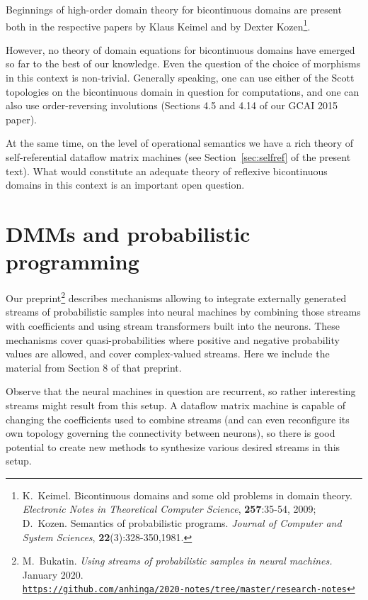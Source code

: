 \documentclass{article}
\begin{document}
Beginnings of high-order domain theory for bicontinuous domains are present both in the respective papers by Klaus Keimel and by Dexter Kozen\footnote{K.~Keimel. Bicontinuous domains and some old problems in domain theory. {\em Electronic Notes in Theoretical Computer Science}, {\bf 257}:35-54, 2009; D.~Kozen. Semantics of probabilistic programs. {\em Journal of Computer and System Sciences}, {\bf 22}(3):328-350,1981.}.

However, no theory of domain equations for bicontinuous domains have emerged so far to the best of our knowledge.
Even the question of the choice of morphisms in this context is non-trivial. Generally speaking, one can use either of the Scott topologies
on the bicontinuous domain in question for computations, and one can also use order-reversing involutions (Sections 4.5 and 4.14 of our GCAI 2015 paper).

At the same time, on the level of operational semantics we have a rich theory of self-referential dataflow
matrix machines (see Section~\ref{sec:selfref} of the present text). What would constitute an adequate theory of reflexive bicontinuous domains in this context is an important open question.

\section{DMMs and probabilistic programming}

Our preprint\footnote{M.~Bukatin. {\em Using streams of probabilistic samples in neural machines.} January 2020.\\
\href{https://github.com/anhinga/2020-notes/tree/master/research-notes}{\tt https://github.com/anhinga/2020-notes/tree/master/research-notes}} describes mechanisms allowing to integrate externally generated streams of
probabilistic samples into neural machines by
combining those streams with coefficients and using stream transformers built into the neurons.
These mechanisms cover quasi-probabilities where positive and negative probability values are allowed,
and cover complex-valued streams. Here we include the material from Section 8 of that preprint.


Observe that the neural machines in question are recurrent, so rather interesting streams might result from this setup.
A dataflow matrix machine is capable of changing the coefficients used to combine streams (and can even reconfigure its own topology governing the connectivity between neurons),
so there is good potential to create new methods to synthesize various desired streams in this setup.
\end{document}
